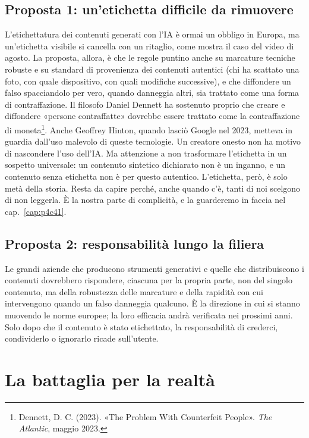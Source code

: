 \subsection{Proposta 1: un'etichetta difficile da rimuovere}
L'etichettatura dei contenuti generati con l'IA è ormai un obbligo in Europa, ma un'etichetta visibile si cancella con un ritaglio, come mostra il caso del video di agosto. La proposta, allora, è che le regole puntino anche su marcature tecniche robuste e su standard di provenienza dei contenuti autentici (chi ha scattato una foto, con quale dispositivo, con quali modifiche successive), e che diffondere un falso spacciandolo per vero, quando danneggia altri, sia trattato come una forma di contraffazione. Il filosofo Daniel Dennett ha sostenuto proprio che creare e diffondere «persone contraffatte» dovrebbe essere trattato come la contraffazione di moneta\footnote{Dennett, D. C. (2023). «The Problem With Counterfeit People». \textit{The Atlantic}, maggio 2023.}. Anche Geoffrey Hinton, quando lasciò Google nel 2023, metteva in guardia dall'uso malevolo di queste tecnologie. Un creatore onesto non ha motivo di nascondere l'uso dell'IA. Ma attenzione a non trasformare l'etichetta in un sospetto universale: un contenuto sintetico dichiarato non è un inganno, e un contenuto senza etichetta non è per questo autentico. L'etichetta, però, è solo metà della storia. Resta da capire perché, anche quando c'è, tanti di noi scelgono di non leggerla. È la nostra parte di complicità, e la guarderemo in faccia nel cap.~\ref{cap:p4c41}.

\subsection{Proposta 2: responsabilità lungo la filiera}
Le grandi aziende che producono strumenti generativi e quelle che distribuiscono i contenuti dovrebbero rispondere, ciascuna per la propria parte, non del singolo contenuto, ma della robustezza delle marcature e della rapidità con cui intervengono quando un falso danneggia qualcuno. È la direzione in cui si stanno muovendo le norme europee; la loro efficacia andrà verificata nei prossimi anni. Solo dopo che il contenuto è stato etichettato, la responsabilità di crederci, condividerlo o ignorarlo ricade sull'utente.

\section{La battaglia per la realtà}


